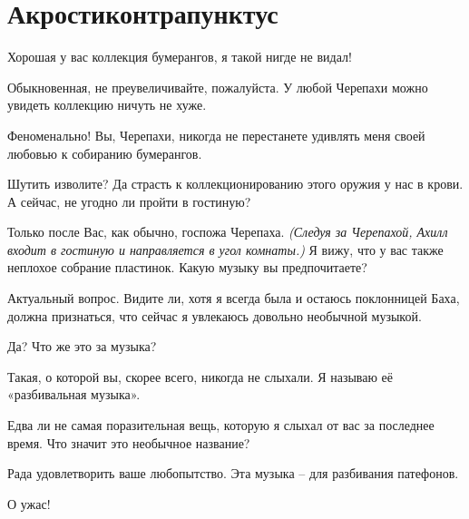 \documentclass[../main.tex]{subfiles}
\begin{document}
\section{Акростиконтрапунктус}


\begin{Dialogue}

 {\Large Х}орошая у вас коллекция бумерангов, я такой нигде не видал!

 Обыкновенная, не преувеличивайте, пожалуйста. У любой Черепахи можно увидеть коллекцию ничуть не хуже.

 Феноменально! Вы, Черепахи, никогда не перестанете удивлять меня своей любовью к собиранию бумерангов.

 Шутить изволите? Да страсть к коллекционированию этого оружия у нас в крови. А сейчас, не угодно ли пройти в гостиную?

 Только после Вас, как обычно, госпожа Черепаха. \emph{(Следуя за Черепахой, Ахилл входит в гостиную и направляется в угол комнаты.)} Я вижу, что у вас также неплохое собрание пластинок. Какую музыку вы предпочитаете?

 Актуальный вопрос. Видите ли, хотя я всегда была и остаюсь поклонницей Баха, должна признаться, что сейчас я увлекаюсь довольно необычной музыкой.

 Да? Что же это за музыка?

 Такая, о которой вы, скорее всего, никогда не слыхали. Я называю её «разбивальная музыка».

 Едва ли не самая поразительная вещь, которую я слыхал от вас за последнее время. Что значит это необычное название?

 Рада удовлетворить ваше любопытство. Эта музыка \--- для разбивания патефонов.

 О ужас!


\end{Dialogue}
\end{document}
